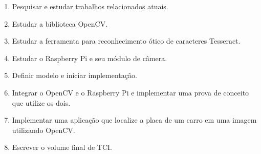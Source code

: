 \begin{enumerate}[I]
	\item Pesquisar e estudar trabalhos relacionados atuais.
	\item Estudar a biblioteca OpenCV\@.
	\item Estudar a ferramenta para reconhecimento ótico de caracteres Tesseract.
	\item Estudar o Raspberry Pi e seu módulo de câmera.
	\item Definir modelo e iniciar implementação.
	\item Integrar o OpenCV e o Raspberry Pi e implementar uma prova de conceito que utilize os dois.
	\item Implementar uma aplicação que localize a placa de um carro em uma imagem utilizando OpenCV.
	\item Escrever o volume final de TCI.
\end{enumerate}

